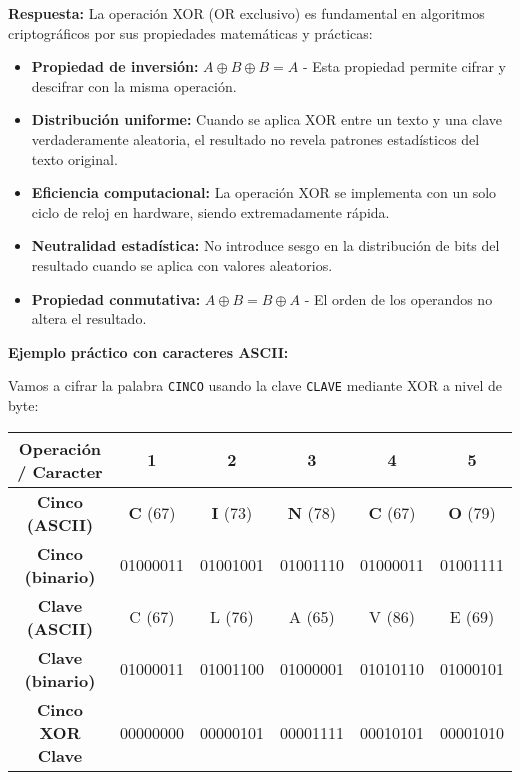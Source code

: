 {\textbf{Respuesta:}
La operación XOR (OR exclusivo) es fundamental en algoritmos criptográficos por sus propiedades matemáticas y prácticas:

\begin{itemize}
    \item \textbf{Propiedad de inversión:} $A \oplus B \oplus B = A$ - Esta propiedad permite cifrar y descifrar con la misma operación.
    
    \item \textbf{Distribución uniforme:} Cuando se aplica XOR entre un texto y una clave verdaderamente aleatoria, el resultado no revela patrones estadísticos del texto original.
    
    \item \textbf{Eficiencia computacional:} La operación XOR se implementa con un solo ciclo de reloj en hardware, siendo extremadamente rápida.
    
    \item \textbf{Neutralidad estadística:} No introduce sesgo en la distribución de bits del resultado cuando se aplica con valores aleatorios.
    
    \item \textbf{Propiedad conmutativa:} $A \oplus B = B \oplus A$ - El orden de los operandos no altera el resultado.
\end{itemize}

\textbf{Ejemplo práctico con caracteres ASCII:}

Vamos a cifrar la palabra \texttt{CINCO} usando la clave \texttt{CLAVE} mediante XOR a nivel de byte:

\begin{center}
\begin{tabular}{|c|c|c|c|c|c|}
\hline
\textbf{Operación / Caracter} & \textbf{1} & \textbf{2} & \textbf{3} & \textbf{4} & \textbf{5} \\
\hline

\textbf{Cinco (ASCII)} & \textbf{C} (67) & \textbf{I} (73) & \textbf{N} (78) & \textbf{C} (67) & \textbf{O} (79) \\
\hline
\textbf{Cinco (binario)} & 01000011 & 01001001 & 01001110 & 01000011 & 01001111 \\
\hline
\textbf{Clave (ASCII)} & C (67) & L (76) & A (65) & V (86) & E (69) \\
\hline
\textbf{Clave (binario)} & 01000011 & 01001100 & 01000001 & 01010110 & 01000101 \\
\hline
\textbf{Cinco XOR Clave} & 00000000 & 00000101 & 00001111 & 00010101 & 00001010 \\
\hline
\end{tabular}
\end{center}

}
